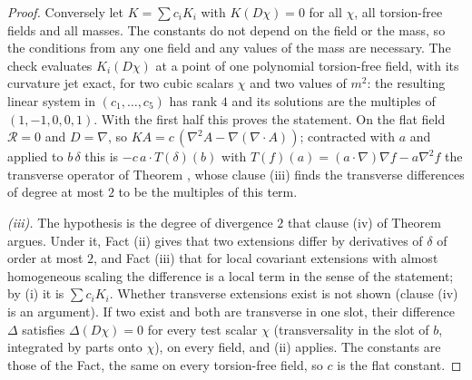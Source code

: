 \begin{proof}
Conversely let $K = \sum c_{i}K_{i}$ with $K(D\chi) = 0$ for all $\chi$, all torsion-free fields and all masses. The constants do not depend on the field or the mass, so the conditions from any one field and any values of the mass are necessary. The check evaluates $K_{i}(D\chi)$ at a point of one polynomial torsion-free field, with its curvature jet exact, for two cubic scalars $\chi$ and two values of $m^{2}$: the resulting linear system in $(c_{1}, \dots, c_{5})$ has rank $4$ and its solutions are the multiples of $(1, -1, 0, 0, 1)$. With the first half this proves the statement. On the flat field $\mathcal{R} = 0$ and $D = \nabla$, so $K A = c\,(\nabla^{2}A - \nabla(\nabla\cdot A))$; contracted with $a$ and applied to $b\,\delta$ this is $-c\,a\cdot T(\delta)(b)$ with $T(f)(a) = (a\cdot\nabla)\nabla f - a\nabla^{2}f$ the transverse operator of Theorem , whose clause (iii) finds the transverse differences of degree at most $2$ to be the multiples of this term.

\emph{(iii).} The hypothesis is the degree of divergence $2$ that clause (iv) of Theorem  argues. Under it, Fact (ii) gives that two extensions differ by derivatives of $\delta$ of order at most $2$, and Fact (iii) that for local covariant extensions with almost homogeneous scaling the difference is a local term in the sense of the statement; by (i) it is $\sum c_{i}K_{i}$. Whether transverse extensions exist is not shown (clause (iv) is an argument). If two exist and both are transverse in one slot, their difference $\Delta$ satisfies $\Delta(D\chi) = 0$ for every test scalar $\chi$ (transversality in the slot of $b$, integrated by parts onto $\chi$), on every field, and (ii) applies. The constants are those of the Fact, the same on every torsion-free field, so $c$ is the flat constant.


\end{proof}
